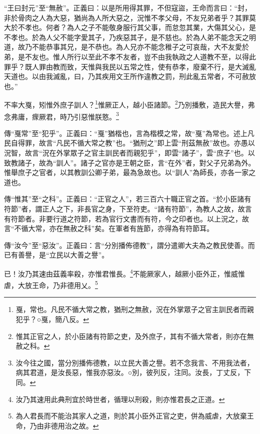 {\noindent\shu{}\fzkt “王曰封元”至“無赦”。正義曰：以是所用得其罪，不但寇盜，王命而言曰：“封，非於骨肉之人為大惡，猶尚為人所大惡之，況惟不孝父母，不友兄弟者乎？其罪莫大於不孝也。何者？為人之子不能敬身服行其父事，而怠忽其業，大傷其父心，是不孝也。於為人父不能字愛其子，乃疾惡其子，是不慈也。於為人弟不能念天之明道，故乃不能恭事其兄，是不恭也。為人兄亦不能念稚子之可哀哉，大不友愛於弟，是不友也。惟人所行以至此不孝不友者，豈不由我執政之人道教不至，以得此罪乎？既人罪由教而致，天惟與我民以五常之性，使有恭孝，廢棄不行，是大滅亂天道也。以由我滅亂，曰，乃其疾用文王所作違教之罰，刑此亂五常者，不可赦放也。” \par}

不率大戛，矧惟外庶子訓人？\footnote{戛，常也。凡民不循大常之教，猶刑之無赦，況在外掌眾子之官主訓民者而親犯乎？○戛，簡八反。}惟厥正人，越小臣諸節。\footnote{惟其正官之人，於小臣諸有符節之吏，及外庶子，其有不循大常者，則亦在無赦之科。}乃別播敷，造民大譽，弗念弗庸，瘝厥君，時乃引惡惟朕憝。\footnote{汝今往之國，當分別播佈德教，以立民大善之譽。若不念我言、不用我法者，病其君道，是汝長惡，惟我亦惡汝。○別，彼列反，注同。汝長，丁丈反，下同。}


{\noindent\zhuan{}\fzbyks 傳“戛常”至“犯乎”。正義曰：“戛”猶楷也，言為楷模之常，故“戛”為常也。述上凡民自得罪，故言“凡民不循大常之教”也。“猶刑之”即上雲“刑茲無赦”故也。亦愚以況智，故言“況在外掌眾子之官主訓民者而親犯乎”，即雲“諸子”，雲“庶子”也。以致教諸子，故為“訓人”。諸子之官亦是王朝之臣，言“在外”者，對父子兄弟為外。惟舉庶子之官者，以其教訓公卿子弟，最為急故也。以“訓人”為師長，亦各一家之道也。 \par}

{\noindent\zhuan{}\fzbyks 傳“惟其”至“之科”。正義曰：“正官之人”，若三百六十職正官之首。“於小臣諸有符節”者，謂正人之下，非長官之身，下至符吏。“諸有符節”，為教人之故，故言有符節者。非要行道之符節，若為官行文書而有符，今之印者也。以上況之，故言“不循大常，亦在無赦之科”矣。在軍者有旌節，亦得為有符節耳。 \par}

{\noindent\zhuan{}\fzbyks 傳“汝今”至“惡汝”。正義曰：言“分別播佈德教”，謂分遣卿大夫為之教民使善。而已有善譽，是“立民以大善之譽”。 \par}

已！汝乃其速由茲義率殺，亦惟君惟長。\footnote{汝乃其速用此典刑宜於時世者，循理以刑殺，則亦惟君長之正道。}不能厥家人，越厥小臣外正，惟威惟虐，大放王命，乃非德用乂。\footnote{為人君長而不能治其家人之道，則於其小臣外正官之吏，併為威虐，大放棄王命，乃由非德用治之故。}


